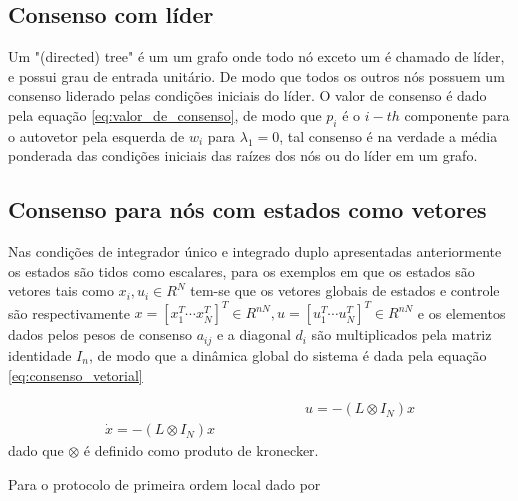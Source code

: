 \subsection{Consenso com líder}
\label{sub:consenso_lider}
Um "(directed) tree" é um um grafo onde todo nó exceto um é chamado de líder, e possui grau de entrada unitário. De modo que todos os outros nós possuem um consenso liderado pelas condições iniciais do líder.
O valor de consenso é dado pela equação \ref{eq:valor_de_consenso}, de modo que $p_{i}$ é o $i-{th}$ componente para o autovetor pela esquerda de $w_{i}$ para $\lambda_{1} = 0$, tal consenso é na verdade a média ponderada das condições iniciais das raízes dos nós ou do líder em um grafo. 

\subsection{Consenso para nós com estados como vetores}
Nas condições de integrador único e integrado duplo apresentadas anteriormente os estados são tidos como escalares, para os exemplos em que os estados são vetores tais como $x_{i}, u_{i} \in R^{N}$ tem-se que os vetores globais de estados e controle são respectivamente $x = [x_{1}^{T} \cdots x_{N}^{T}]^{T} \in R^{nN} , 
u = [u_{1}^{T}  \cdots u_{N}^{T}]^{T} \in R^{nN} $ e os elementos dados pelos pesos de consenso $a_{ij}$ e a diagonal $d_{i}$ são multiplicados pela matriz identidade $I_{n}$, de modo que a dinâmica global do sistema é dada pela equação \ref{eq:consenso_vetorial}

\begin{equation}\label{eq:consenso_vetorial}
 \begin{aligned}
 \hspace{6cm} %
    u = -(L \otimes I_{N})x \\
    \dot x = -(L \otimes I_{N}) x
    \end{aligned}
\end{equation}
dado que $\otimes$ é definido como produto de kronecker.

Para o protocolo de primeira ordem local dado por %



